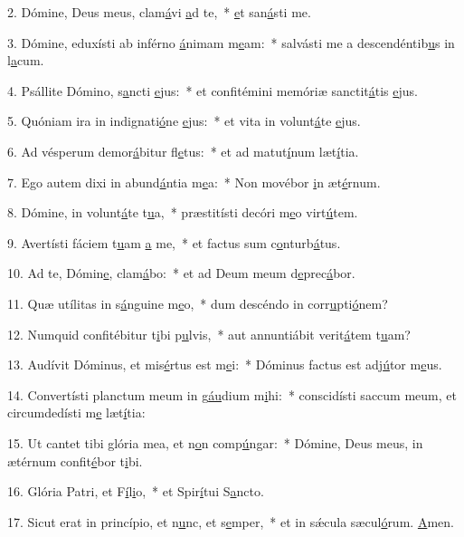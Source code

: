 2. Dómine, Deus meus, clam\uline{á}vi \uline{a}d te,~* \uline{e}t san\uline{á}sti me.\par 
3. Dómine, eduxísti ab inférno \uline{á}nimam m\uline{e}am:~* salvásti me a descendéntib\uline{u}s in l\uline{a}cum.\par 
4. Psállite Dómino, s\uline{a}ncti \uline{e}jus:~* et confitémini memóriæ sanctit\uline{á}tis \uline{e}jus.\par 
5. Quóniam ira in indignati\uline{ó}ne \uline{e}jus:~* et vita in volunt\uline{á}te \uline{e}jus.\par 
6. Ad vésperum demor\uline{á}bitur fl\uline{e}tus:~* et ad matut\uline{í}num læt\uline{í}tia.\par 
7. Ego autem dixi in abund\uline{á}ntia m\uline{e}a:~* Non movébor \uline{i}n æt\uline{é}rnum.\par 
8. Dómine, in volunt\uline{á}te t\uline{u}a,~* præstitísti decóri m\uline{e}o virt\uline{ú}tem.\par 
9. Avertísti fáciem t\uline{u}am \uline{a} me,~* et factus sum c\uline{o}nturb\uline{á}tus.\par 
10. Ad te, Dómin\uline{e}, clam\uline{á}bo:~* et ad Deum meum d\uline{e}prec\uline{á}bor.\par 
11. Quæ utílitas in s\uline{á}nguine m\uline{e}o,~* dum descéndo in corr\uline{u}pti\uline{ó}nem?\par 
12. Numquid confitébitur t\uline{i}bi p\uline{u}lvis,~* aut annuntiábit verit\uline{á}tem t\uline{u}am?\par 
13. Audívit Dóminus, et mis\uline{é}rtus est m\uline{e}i:~* Dóminus factus est adj\uline{ú}tor m\uline{e}us.\par 
14. Convertísti planctum meum in g\uline{áu}dium m\uline{i}hi:~* conscidísti saccum meum, et circumdedísti m\uline{e} læt\uline{í}tia:\par 
15. Ut cantet tibi glória mea, et n\uline{o}n comp\uline{ú}ngar:~* Dómine, Deus meus, in ætérnum confit\uline{é}bor t\uline{i}bi.\par 
16. Glória Patri, et F\uline{í}l\uline{i}o,~* et Spir\uline{í}tui S\uline{a}ncto.\par 
17. Sicut erat in princípio, et n\uline{u}nc, et s\uline{e}mper,~* et in sǽcula sæcul\uline{ó}rum. \uline{A}men.\par 
